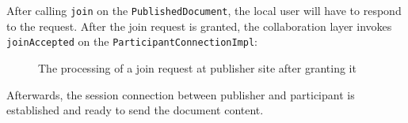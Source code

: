 After calling \texttt{join} on the \texttt{PublishedDocument}, the local user will have to respond to the request. After the join request is granted, the collaboration layer invokes \texttt{joinAccepted} on the \texttt{ParticipantConnectionImpl}:


\begin{figure}[H]
 \centering
 \caption{The processing of a join request at publisher site after granting it}
 \label{fig:network.protocol.joinrequest2}
\end{figure}


Afterwards, the session connection between publisher and participant is established and ready to send the document content.



